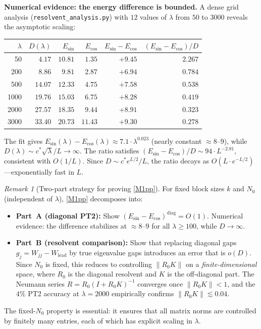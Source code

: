 \documentclass[12pt,a4paper]{article}
\theoremstyle{definition}
\theoremstyle{remark}
\newtheorem{remark}[theorem]{Remark}
\begin{document}
\noindent\textbf{Numerical evidence: the energy difference is bounded.} A dense grid analysis (\texttt{resolvent\_analysis.py}) with $12$ values of $\lambda$ from $50$ to $3000$ reveals the asymptotic scaling:

\begin{center}
\small
\renewcommand{\arraystretch}{1.15}
\begin{tabular}{r|r|r|r|r|r}
$\lambda$ & $D(\lambda)$ & $E_{\sin}$ & $E_{\cos}$ & $E_{\sin}\!-\!E_{\cos}$ & $(E_{\sin}\!-\!E_{\cos})/D$ \\\hline
50   & $4.17$  & $10.81$ & $1.35$ & $+9.45$ & $2.267$ \\
200  & $8.86$  & $9.81$  & $2.87$ & $+6.94$ & $0.784$ \\
500  & $14.07$ & $12.33$ & $4.75$ & $+7.58$ & $0.538$ \\
1000 & $19.76$ & $15.03$ & $6.75$ & $+8.28$ & $0.419$ \\
2000 & $27.57$ & $18.35$ & $9.44$ & $+8.91$ & $0.323$ \\
3000 & $33.40$ & $20.73$ & $11.43$ & $+9.30$ & $0.278$
\end{tabular}
\end{center}

\noindent The fit gives $E_{\sin}(\lambda) - E_{\cos}(\lambda) \approx 7.1\cdot\lambda^{0.023}$ (nearly constant $\approx 8$--$9$), while $D(\lambda) \sim c^*\sqrt{\lambda}/L \to \infty$. The ratio satisfies $(E_{\sin} - E_{\cos})/D \sim 94\cdot L^{-2.81}$, consistent with $O(1/L)$. Since $D \sim c^* e^{L/2}/L$, the ratio decays as $O(L\cdot e^{-L/2})$---exponentially fast in $L$.

\begin{remark}[Two-part strategy for proving \ref{M1pp}]
\label{rem:two-parts}
For fixed block sizes $k$ and $N_0$ (independent of $\lambda$), \ref{M1pp} decomposes into:
\begin{itemize}
  \item \textbf{Part~A (diagonal PT2):} Show $(E_{\sin} - E_{\cos})^{\mathrm{diag}} = O(1)$. Numerical evidence: the difference stabilizes at $\approx 8$--$9$ for all $\lambda \geq 100$, while $D \to \infty$.
  \item \textbf{Part~B (resolvent comparison):} Show that replacing diagonal gaps $g_j = W_{jj} - W_{\mathrm{lead}}$ by true eigenvalue gaps introduces an error that is $o(D)$. Since $N_0$ is fixed, this reduces to controlling $\|R_0 K\|$ on a \emph{finite-dimensional} space, where $R_0$ is the diagonal resolvent and $K$ is the off-diagonal part. The Neumann series $R = R_0(I + R_0 K)^{-1}$ converges once $\|R_0 K\| < 1$, and the $4\%$ PT2 accuracy at $\lambda = 2000$ empirically confirms $\|R_0 K\| \lesssim 0.04$.
\end{itemize}
The fixed-$N_0$ property is essential: it ensures that all matrix norms are controlled by finitely many entries, each of which has explicit scaling in $\lambda$.
\end{remark}
\end{document}
